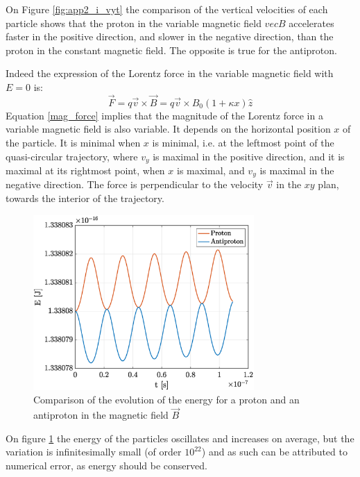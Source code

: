 \documentclass[a4paper,12pt,twoside]{article}
\begin{document}
On Figure \ref{fig:app2_i_vyt} the comparison of the vertical velocities of each particle shows that the proton in the variable magnetic field $vec{B}$ accelerates faster in the positive direction, and slower in the negative direction, than the proton in the constant magnetic field. The opposite is true for the antiproton.

Indeed the expression of the Lorentz force in the variable magnetic field with $E=0$ is:
\begin{equation}
	\vec{F} = q\vec{v} \times \vec{B} = q\vec{v} \times B_0(1+\kappa x)\hat{z}
	\label{mag_force}
\end{equation}
Equation \ref{mag_force} implies that the magnitude of the Lorentz force in a variable magnetic field is also variable. It depends on the horizontal position $x$ of the particle. It is minimal when $x$ is minimal, i.e. at the leftmost point of the quasi-circular trajectory, where $v_y$ is maximal in the positive direction, and it is maximal at its rightmost point, when $x$ is maximal, and $v_y$ is maximal in the negative direction. The force is perpendicular to the velocity $\vec{v}$ in the $xy$ plan, towards the interior of the trajectory.

\begin{figure}[h]
\centering
	\includegraphics[width=0.75\textwidth]{graphs/app2_i_ene.eps}
	\caption{Comparison of the evolution of the energy for a proton and an antiproton in the magnetic field $\vec{B}$}
	\label{fig:app2_i_ene}
\end{figure}

On figure \ref{fig:app2_i_ene} the energy of the particles oscillates and increases on average, but the variation is infinitesimally small (of order $10^{22}$) and as such can be attributed to numerical error, as energy should be conserved.
\end{document}
